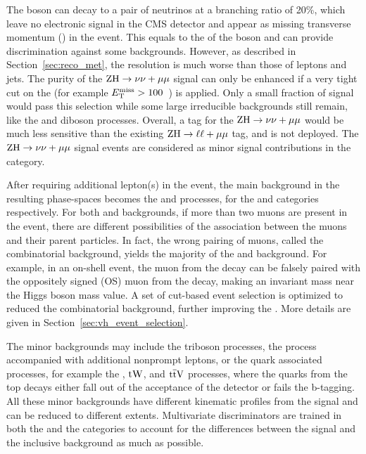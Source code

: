 The \PZ boson can decay to a pair of neutrinos at a branching ratio of 20\%, 
which leave no electronic signal in the CMS detector and appear as missing transverse momentum (\MET) in the event.
This \MET equals to the \pt of the \PZ boson and can provide discrimination against some backgrounds.
However, as described in Section~\ref{sec:reco_met}, 
the \MET resolution is much worse than those of leptons and jets.
The purity of the $\mathrm{Z}\mathrm{H} \to \nu\nu+\mu\mu$ signal can only be enhanced if a very tight cut on the \MET (for example $E_{\mathrm{T}}^{\text{miss}}>100$~\GeV) is applied.
Only a small fraction of \ZH signal would pass this selection 
while some large irreducible backgrounds still remain, like the \ttbar and diboson processes.
Overall, a tag for the $\mathrm{Z}\mathrm{H} \to \nu\nu+\mu\mu$ would be much less sensitive than the existing $\mathrm{Z}\mathrm{H} \to \ell\ell+\mu\mu$ tag, and is not deployed.
The $\mathrm{Z}\mathrm{H} \to \nu\nu+\mu\mu$ signal events are considered as minor signal contributions in the \ggH category.

After requiring additional lepton(s) in the event, the main background in the resulting \VH phase-spaces becomes the \WZ and \ZZ processes, for the \WH and \ZH categories respectively.
For both \WZ and \ZZ backgrounds, if more than two muons are present in the event, 
there are different possibilities of the association between the muons and their parent particles.
In fact, the wrong pairing of muons, called the combinatorial background, yields the majority of the \WZ and \ZZ background.
For example, in an on-shell \WZ event, the muon from the \PW decay can be falsely paired with the oppositely signed (OS) muon from the \PZ decay, 
making an invariant mass near the Higgs boson mass value.
A set of cut-based event selection is optimized to reduced the combinatorial background, further improving the \SoB. 
More details are given in Section~\ref{sec:vh_event_selection}.

The minor backgrounds may include the triboson processes, the \DY process accompanied with additional nonprompt leptons, 
or the \Pqt quark associated processes, for example the \ttbar, $\mathrm{t}\mathrm{W}$, and $\mathrm{t}\overline{\mathrm{t}}\mathrm{V}$ processes, 
where the \Pqb quarks from the top decays either fall out of the acceptance of the detector or fails the b-tagging. 
All these minor backgrounds have different kinematic profiles from the signal and can be reduced to different extents. 
Multivariate discriminators are trained in both the \WH and the \ZH categories to account for the differences between the signal and the inclusive background as much as possible.

